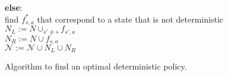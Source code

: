 \begin{figure}[h!]
{{\hspace*{3ex} \hspace*{3ex} \hspace*{3ex} {\bf else}:\\
\hspace*{3ex} \hspace*{3ex} \hspace*{3ex} \hspace*{3ex} find $f^*_{s,a}$ that correspond to a state that is not deterministic  \\
\hspace*{3ex} \hspace*{3ex} \hspace*{3ex} \hspace*{3ex} $N_L := N \cup_{s' \neq s} f_{s',a}$  \\
\hspace*{3ex} \hspace*{3ex} \hspace*{3ex} \hspace*{3ex} $N_R := N \cup f_{s,a}$  \\
\hspace*{3ex} \hspace*{3ex} \hspace*{3ex} \hspace*{3ex} $\mathcal{N} := \mathcal{N} \cup N_L \cup N_R$\\
}}
\caption{Algorithm to find an optimal deterministic policy.} \label{fig:basic_bb}
\end{figure}
